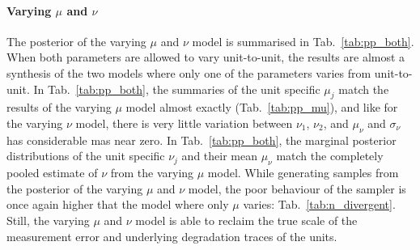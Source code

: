 \paragraph{Varying $\mu$ and $\nu$} The posterior of the varying $\mu$ and $\nu$ model is summarised in Tab.~\ref{tab:pp_both}. When both parameters are allowed to vary unit-to-unit, the results are almost a synthesis of the two models where only one of the parameters varies from unit-to-unit. In Tab.~\ref{tab:pp_both}, the summaries of the unit specific $\mu_j$ match the results of the varying $\mu$ model almost exactly (Tab.~\ref{tab:pp_mu}), and like for the varying $\nu$ model, there is very little variation between $\nu_1$, $\nu_2$, and $\mu_\nu$ and $\sigma_\nu$ has considerable mas near zero. In Tab.~\ref{tab:pp_both}, the marginal posterior distributions of the unit specific $\nu_j$ and their mean $\mu_\nu$ match the completely pooled estimate of $\nu$ from the varying $\mu$ model. While generating samples from the posterior of the varying $\mu$ and $\nu$ model, the poor behaviour of the sampler is once again higher that the model where only $\mu$ varies: Tab.~\ref{tab:n_divergent}. Still, the varying $\mu$ and $\nu$ model is able to reclaim the true scale of the measurement error and underlying degradation traces of the units.



